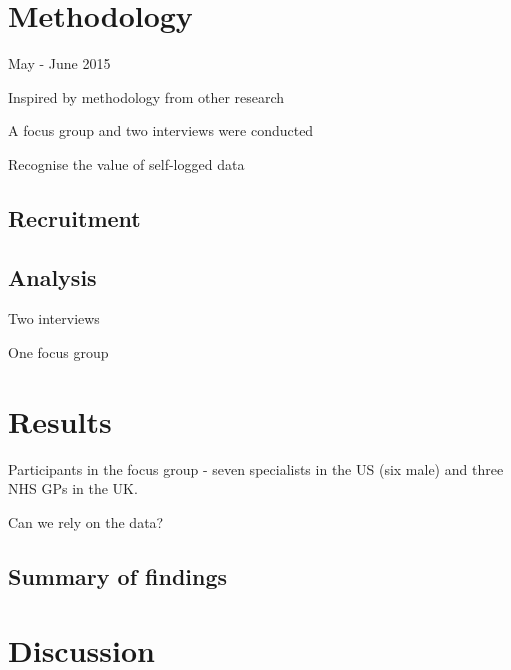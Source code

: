 \documentclass{sigchi}
\begin{document}




\section{Methodology}

May - June 2015

Inspired by methodology from other research

A focus group and two interviews were conducted

Recognise the value of self-logged data


\subsection{Recruitment}

\subsection{Analysis}

Two interviews

One focus group

\section{Results}

Participants in the focus group - seven specialists in the US (six male) and three NHS GPs in the UK.

Can we rely on the data?

\subsection{Summary of findings}

\section{Discussion}
\end{document}
